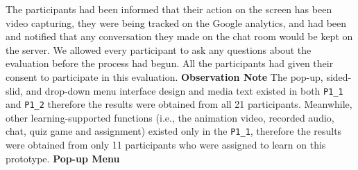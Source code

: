 The participants had been informed that their action on the screen has been video capturing, they were being tracked on the Google analytics, and had been and notified that any conversation they made on the chat room would be kept on the server. We allowed every participant to ask any questions about the evaluation before the process had begun. All the participants had given their consent to participate in this evaluation. 
\newline 
\newline 
\noindent\textbf{Observation Note} 
\newline
The pop-up, sided-slid, and drop-down menu interface design and media text existed in both \verb|P1_1| and \verb|P1_2| therefore the results were obtained from all 21 participants. Meanwhile, other learning-supported functions (i.e., the animation video, recorded audio, chat, quiz game and assignment) existed only in the \verb|P1_1|, therefore the results were obtained from only 11 participants who were assigned to learn on this prototype. 
\newline 
\newline
\noindent\textbf{Pop-up Menu} 

